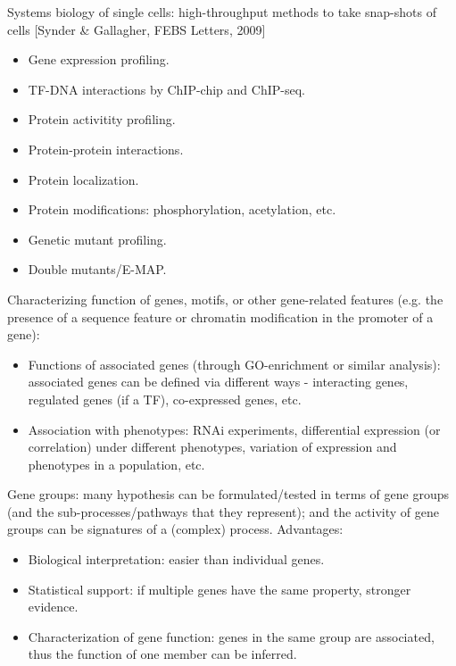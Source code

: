 \documentclass{report}
\begin{document}
Systems biology of single cells: high-throughput methods to take snap-shots of cells [Synder \& Gallagher, FEBS Letters, 2009]
\begin{itemize}
	\item Gene expression profiling. 
	\item TF-DNA interactions by ChIP-chip and ChIP-seq. 
	\item Protein activitity profiling. 
	\item Protein-protein interactions. 
	\item Protein localization. 
	\item Protein modifications: phosphorylation, acetylation, etc. 
	\item Genetic mutant profiling. 
	\item Double mutants/E-MAP. 
\end{itemize}

Characterizing function of genes, motifs, or other gene-related features (e.g. the presence of a sequence feature or chromatin modification in the promoter of a gene): 
\begin{itemize}
\item Functions of associated genes (through GO-enrichment or similar analysis): associated genes can be defined via different ways - interacting genes, regulated genes (if a TF), co-expressed genes, etc. 
\item Association with phenotypes: RNAi experiments, differential expression (or correlation) under different phenotypes, variation of expression and phenotypes in a population, etc. 
\end{itemize}

Gene groups: many hypothesis can be formulated/tested in terms of gene groups (and the sub-processes/pathways that they represent); and the activity of gene groups can be signatures of a (complex) process. Advantages: 
\begin{itemize}
	\item Biological interpretation: easier than individual genes. 
	\item Statistical support: if multiple genes have the same property, stronger evidence. 
	\item Characterization of gene function: genes in the same group are associated, thus the function of one member can be inferred. 
\end{itemize}
\end{document}
